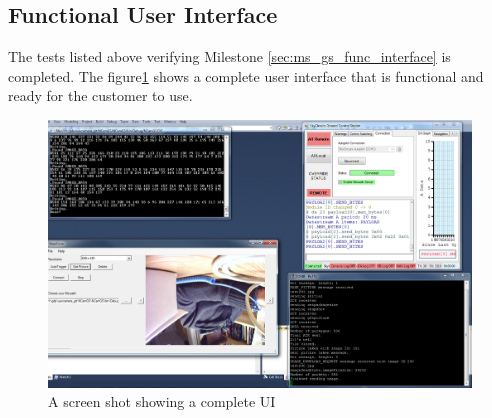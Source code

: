 \subsection{Functional User Interface}
\label{func_UI}
The tests listed above verifying Milestone \ref{sec:ms_gs_func_interface} is completed. The figure\ref{completeGUI} shows a complete user interface that is functional and ready for the customer to use.
\begin{figure}[H]
\begin{center}
\includegraphics[width=1.00\textwidth]{testing_screenshots/complete_testing_3.png} 
\end{center}
\caption{A screen shot showing a complete UI\label{completeGUI}}
\end{figure}



